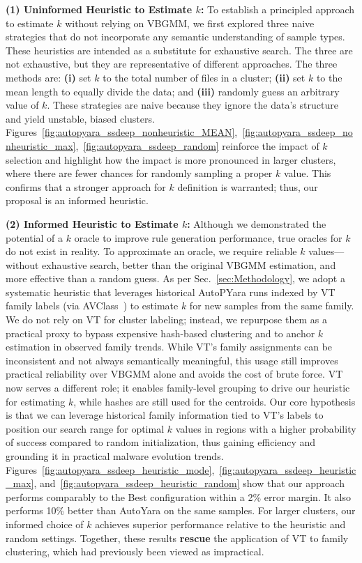 \noindent\textbf{(1) Uninformed Heuristic to Estimate $k$:}
To establish a principled approach to estimate $k$ without relying on VBGMM, we first explored three naive strategies that do not incorporate any semantic understanding of sample types. These heuristics are intended as a substitute for exhaustive search. The three are not exhaustive, but they are representative of different approaches. The three methods are: \textbf{(i)} set $k$ to the total number of files in a cluster; \textbf{(ii)} set $k$ to the mean length to equally divide the data; and \textbf{(iii)} randomly guess an arbitrary value of $k$. These strategies are naive because they ignore the data’s structure and yield unstable, biased clusters.
%
Figures~\ref{fig:autopyara_ssdeep_nonheuristic_MEAN},~\ref{fig:autopyara_ssdeep_nonheuristic_max},~\ref{fig:autopyara_ssdeep_random} reinforce the impact of $k$ selection and highlight how the impact is more pronounced in larger clusters, where there are fewer chances for randomly sampling a proper $k$ value. This confirms that a stronger approach for $k$ definition is warranted; thus, our proposal is an informed heuristic.


\noindent\textbf{(2) Informed Heuristic to Estimate $k$:} Although we demonstrated the potential of a $k$ oracle to improve rule generation performance, true oracles for $k$ do not exist in reality. To approximate an oracle, we require reliable $k$ values—without exhaustive search, better than the original VBGMM estimation, and more effective than a random guess. As per Sec.~\ref{sec:Methodology}, we adopt a systematic heuristic that leverages historical AutoPYara runs indexed by VT family labels (via AVClass~\cite{DBLP:journals/corr/abs-2006-10615}) to estimate $k$ for new samples from the same family. We do not rely on VT for cluster labeling; instead, we repurpose them as a practical proxy to bypass expensive hash-based clustering and to anchor $k$ estimation in observed family trends. While VT’s family assignments can be inconsistent and not always semantically meaningful, this usage still improves practical reliability over VBGMM alone and avoids the cost of brute force. VT now serves a different role; it enables family-level grouping to drive our heuristic for estimating $k$, while hashes are still used for the centroids.  Our core hypothesis is that we can leverage historical family information tied to VT's labels to position our search range for optimal $k$ values in regions with a higher probability of success compared to random initialization, thus gaining efficiency and grounding it in practical malware evolution trends. Figures~\ref{fig:autopyara_ssdeep_heuristic_mode},~\ref{fig:autopyara_ssdeep_heuristic_max}, and~\ref{fig:autopyara_ssdeep_heuristic_random} show that our approach performs comparably to the Best configuration within a 2\% error margin. It also performs 10\% better than AutoYara on the same samples. For larger clusters, our informed choice of $k$ achieves superior performance relative to the heuristic and random settings. Together, these results \textbf{rescue} the application of VT to family clustering, which had previously been viewed as impractical.

